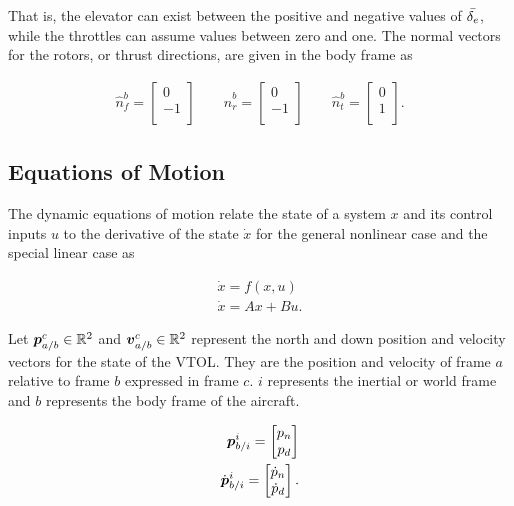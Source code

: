 That is, the elevator can exist between the positive and negative values of $\Bar{\delta_e}$, while the throttles can assume values between zero and one. 
The normal vectors for the rotors, or thrust directions, are given in the body frame as

\begin{align}
    \hat{n}^b_{f} =
    \begin{bmatrix}
        0\\
        -1\\
    \end{bmatrix}
    \qquad
    \hat{n}^b_{r} =
    \begin{bmatrix}
        0\\
        -1\\
    \end{bmatrix}
    \qquad
    \hat{n}^b_{t} =
    \begin{bmatrix}
        0\\
        1\\
    \end{bmatrix}.
\end{align}

\subsection{Equations of Motion}

The dynamic equations of motion relate the state of a system $x$ and its control inputs $u$ to the derivative of the state $\dot{x}$ for the general nonlinear case and the special linear case as

\begin{align}
  \dot{x} = f(x,u)\\
  \dot{x} = Ax + Bu
  .
\end{align}

Let $\boldsymbol{p}_{a/b}^c\in\mathbb{R}^2$ and $\boldsymbol{v}_{a/b}^c\in\mathbb{R}^2$ represent the north and down position and velocity vectors for the state of the VTOL. 
They are the position and velocity of frame $a$ relative to frame $b$ expressed in frame $c$. 
$i$ represents the inertial or world frame and $b$ represents the body frame of the aircraft. 

\begin{align}
    \boldsymbol{p}_{b/i}^i =
    \begin{bmatrix}
        p_n\\
        p_d\\
    \end{bmatrix}\\
    \dot{\boldsymbol{p}}_{b/i}^i =
    \begin{bmatrix}
        \dot{p}_n\\
        \dot{p}_d
    \end{bmatrix}
    .
\end{align}

